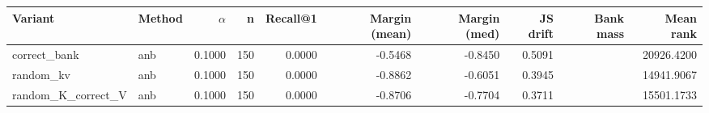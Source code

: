 \begin{tabular}{l l r r r r r r r r}
\toprule
Variant & Method & $\alpha$ & n & Recall@1 & Margin (mean) & Margin (med) & JS drift & Bank mass & Mean rank \\
\midrule
correct\_bank & anb & 0.1000 & 150 & 0.0000 & -0.5468 & -0.8450 & 0.5091 &  & 20926.4200 \\
random\_kv & anb & 0.1000 & 150 & 0.0000 & -0.8862 & -0.6051 & 0.3945 &  & 14941.9067 \\
random\_K\_correct\_V & anb & 0.1000 & 150 & 0.0000 & -0.8706 & -0.7704 & 0.3711 &  & 15501.1733 \\
\bottomrule
\end{tabular}
